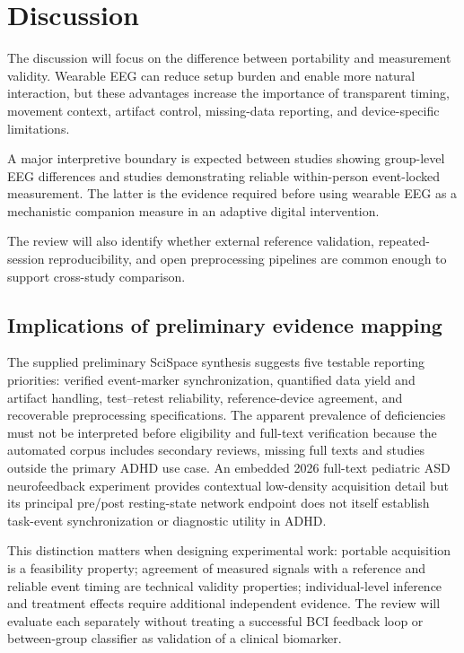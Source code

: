 \section{Discussion}

The discussion will focus on the difference between portability and measurement validity. Wearable EEG can reduce setup burden and enable more natural interaction, but these advantages increase the importance of transparent timing, movement context, artifact control, missing-data reporting, and device-specific limitations.

A major interpretive boundary is expected between studies showing group-level EEG differences and studies demonstrating reliable within-person event-locked measurement. The latter is the evidence required before using wearable EEG as a mechanistic companion measure in an adaptive digital intervention.

The review will also identify whether external reference validation, repeated-session reproducibility, and open preprocessing pipelines are common enough to support cross-study comparison.


\subsection{Implications of preliminary evidence mapping}

The supplied preliminary SciSpace synthesis suggests five testable reporting priorities: verified event-marker synchronization, quantified data yield and artifact handling, test--retest reliability, reference-device agreement, and recoverable preprocessing specifications. The apparent prevalence of deficiencies must not be interpreted before eligibility and full-text verification because the automated corpus includes secondary reviews, missing full texts and studies outside the primary ADHD use case. An embedded 2026 full-text pediatric ASD neurofeedback experiment provides contextual low-density acquisition detail but its principal pre/post resting-state network endpoint does not itself establish task-event synchronization or diagnostic utility in ADHD.

This distinction matters when designing experimental work: portable acquisition is a feasibility property; agreement of measured signals with a reference and reliable event timing are technical validity properties; individual-level inference and treatment effects require additional independent evidence. The review will evaluate each separately without treating a successful BCI feedback loop or between-group classifier as validation of a clinical biomarker.
